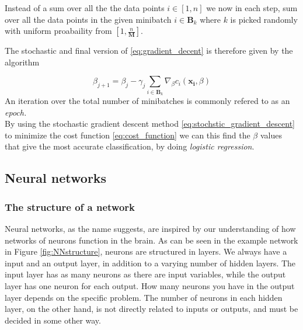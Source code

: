 Instead of a sum over all the the data points $i \in [1,n]$ we now in each step, sum over all the data points in the given minibatch $i \in \boldsymbol{B}_k$ where $k$ is picked randomly with uniform proabaility from $[1, \frac{n}{\boldsymbol{M}}]$.

The stochastic and final version of \eqref{eq:gradient_decent} is therefore given by the algorithm

\begin{equation}
    \beta_{j+1} = \beta_j - \gamma_j \sum_{i \in \boldsymbol{B}_k}\nabla_\beta c_i(\boldsymbol{x_i},\beta)
    \label{eq:stochstic_gradient_descent}
\end{equation}
An iteration over the total number of minibatches is commonly refered to as an \textit{epoch.}\\

By using the stochastic gradient descent method \eqref{eq:stochstic_gradient_descent} to minimize the cost function \eqref{eq:cost_function} we can this find the $\beta$ values that give the most accurate classification, by doing \textit{logistic regression}.

\subsection{Neural networks}
\subsubsection*{The structure of a network}
Neural networks, as the name suggests, are inspired by our understanding of how networks of neurons function in the brain. As can be seen in the example network in Figure \ref{fig:NNstructure}, neurons are structured in layers. We always have a input and an output layer, in addition to a varying number of hidden layers. The input layer has as many neurons as there are input variables, while the output layer has one neuron for each output. How many neurons you have in the output layer depends on the specific problem. The number of neurons in each hidden layer, on the other hand, is not directly related to inputs or outputs, and must be decided in some other way.

